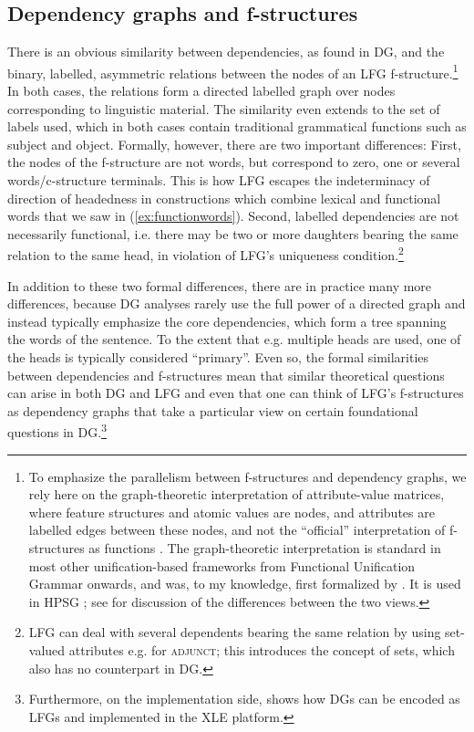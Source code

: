 \documentclass[output=paper,hidelinks]{langscibook}
\begin{document}
\subsection{Dependency graphs and f-structures}
There is an obvious similarity between dependencies, as found in DG,
and the binary, labelled, asymmetric relations between the nodes of an
LFG f-structure.\footnote{To emphasize the parallelism between
f-structures and dependency graphs, we rely here on the
graph-theoretic interpretation of attribute-value matrices, where
feature structures and atomic values are nodes, and attributes are
labelled edges between these nodes, and not the ``official''
interpretation of f-structures as functions
\citep{kaplan1995formal,kaplanbresnan82}. The graph-theoretic interpretation is standard in most other
unification-based frameworks from Functional Unification Grammar \citep{kay1979functional} onwards, and was, to my knowledge, first formalized by \citet{MoshierRounds}. It is used in HPSG \citep{rich:20}; see
 for discussion of the
differences between the two views.} In both cases, the
relations form a directed labelled graph over nodes corresponding to
linguistic material. The similarity even extends to the set of labels
used, which in both cases contain traditional grammatical functions
such as subject and object. Formally, however, there are two important
differences: First, the nodes of the f-structure are not words, but
correspond to zero, one or several words/c-structure terminals. This
is how LFG escapes the indeterminacy of direction of headedness in
constructions which combine lexical and functional words that we saw
in (\ref{ex:functionwords}).
Second, labelled dependencies are
not necessarily functional, i.e. there may be two or more daughters
bearing the same relation to the same head, in violation of LFG's
uniqueness condition.\footnote{LFG can deal with several dependents bearing the same relation by using set-valued attributes e.g. for \textsc{adjunct}; this introduces the concept of sets, which also has no counterpart in DG.}

In addition to these two formal differences, there are in practice
many more differences, because DG analyses rarely use the full power
of a directed graph and instead typically emphasize the core
dependencies, which form a tree spanning the words of the sentence. To the extent
that e.g. multiple heads are used, one of the heads is typically considered ``primary''. Even so, the
formal similarities between dependencies and f-structures mean that
similar theoretical questions can arise in both DG and LFG and even
that one can think of LFG's f-structures as dependency graphs that
take a particular view on certain foundational questions in DG.\footnote{Furthermore, on the implementation side, \citet{broker-1998} shows how DGs can be encoded as LFGs and implemented in the XLE platform.}
\end{document}
